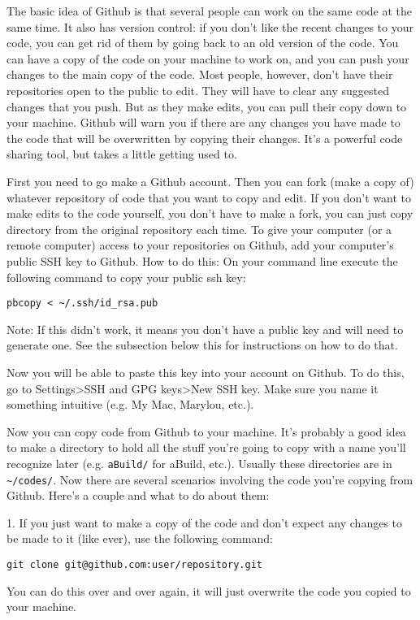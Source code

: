 \documentclass{article}
\begin{document}
The basic idea of Github is that several people can work on the same
code at the same time. It also has version control: if you don't like
the recent changes to your code, you can get rid of them by going back
to an old version of the code. You can have a copy of the code on your
machine to work on, and you can push your changes to the main copy of
the code. Most people, however, don't have their repositories open to
the public to edit. They will have to clear any suggested changes that
you push. But as they make edits, you can pull their copy down to your
machine. Github will warn you if there are any changes you have made
to the code that will be overwritten by copying their changes. It's a
powerful code sharing tool, but takes a little getting used to.

First you need to go make a Github account. Then you can fork (make a
copy of) whatever repository of code that you want to copy and
edit. If you don't want to make edits to the code yourself, you don't
have to make a fork, you can just copy directory from the original
repository each time.
To give your computer (or a remote computer) access to your repositories
on Github, add your computer's public SSH key to Github. How to do
this:
On your command line execute the following command to copy
your public ssh key:
\begin{verbatim}
pbcopy < ~/.ssh/id_rsa.pub
\end{verbatim}
Note: If this didn't work, it means you don't have a public key and will
need to generate one. See the subsection below this for instructions
on how to do that. 

Now you will be able to paste this key into your account on Github. To
do this, go to Settings>SSH and GPG keys>New SSH key. Make sure you
name it something intuitive (e.g. My Mac, Marylou, etc.).

Now you can copy code from Github to your machine. It's
probably a good idea to make a directory to hold all the stuff you're
going to copy with a name you'll recognize later (e.g. \verb|aBuild/|
for aBuild, etc.). Usually these directories are in
\verb|~/codes/|. Now there are several scenarios involving the code
you're copying from Github. Here's a couple and what to do about them:

1. If you just want to make a copy of the code and don't
expect any changes to be made to it (like ever), use the following command:
\begin{verbatim}
git clone git@github.com:user/repository.git
\end{verbatim}
You can do this over and over again, it will just overwrite the code
you copied to your machine. 
\end{document}
